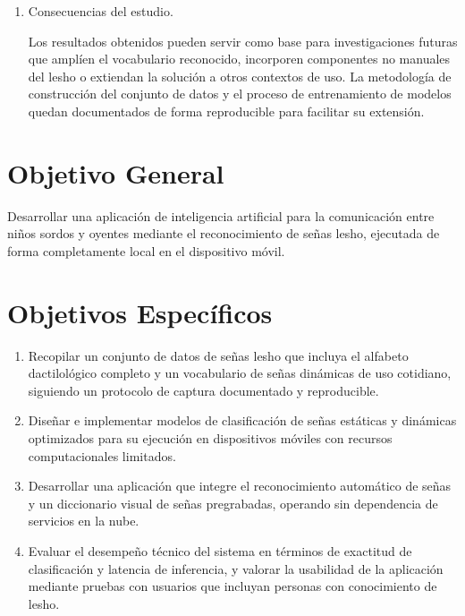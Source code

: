 \begin{enumerate}
    \item Consecuencias del estudio.

    Los resultados obtenidos pueden servir como base para investigaciones futuras que
    amplíen el vocabulario reconocido, incorporen componentes no manuales del \acrshort{lesho}
    o extiendan la solución a otros contextos de uso. La metodología de construcción
    del conjunto de datos y el proceso de entrenamiento de modelos quedan documentados de
    forma reproducible para facilitar su extensión.
\end{enumerate}

\section{Objetivo General}

Desarrollar una aplicación de inteligencia artificial para la comunicación entre niños
sordos y oyentes mediante el reconocimiento de señas \acrshort{lesho}, ejecutada de forma
completamente local en el dispositivo móvil.

\section{Objetivos Específicos}

\begin{enumerate}
    \item Recopilar un conjunto de datos de señas \acrshort{lesho} que incluya el alfabeto dactilológico
    completo y un vocabulario de señas dinámicas de uso cotidiano, siguiendo un protocolo
    de captura documentado y reproducible.

    \item Diseñar e implementar modelos de clasificación de señas estáticas y dinámicas
    optimizados para su ejecución en dispositivos móviles con recursos computacionales
    limitados.

    \item Desarrollar una aplicación que integre el reconocimiento automático de señas y un
    diccionario visual de señas pregrabadas, operando sin dependencia de servicios en la
    nube.

    \item Evaluar el desempeño técnico del sistema en términos de exactitud de clasificación y
    latencia de inferencia, y valorar la usabilidad de la aplicación mediante pruebas con
    usuarios que incluyan personas con conocimiento de \acrshort{lesho}.
\end{enumerate}
